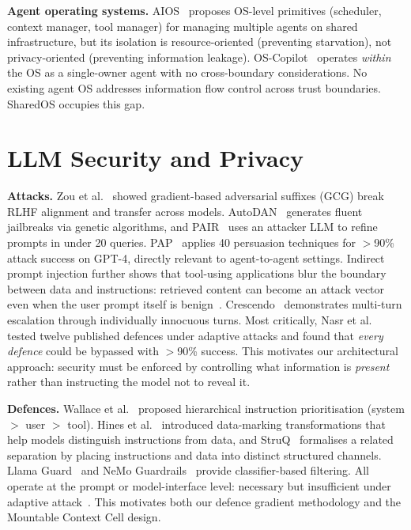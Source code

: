 \textbf{Agent operating systems.} AIOS~\cite{mei2025aios} proposes OS-level primitives (scheduler, context manager, tool manager) for managing multiple agents on shared infrastructure, but its isolation is resource-oriented (preventing starvation), not privacy-oriented (preventing information leakage). OS-Copilot~\cite{wu2024oscopilot} operates \textit{within} the OS as a single-owner agent with no cross-boundary considerations. No existing agent OS addresses information flow control across trust boundaries. SharedOS occupies this gap.


\section{LLM Security and Privacy}
\label{sec:rw_security}

\textbf{Attacks.} Zou et al.~\cite{zou2023universal} showed gradient-based adversarial suffixes (GCG) break RLHF alignment and transfer across models. AutoDAN~\cite{liu2024autodan} generates fluent jailbreaks via genetic algorithms, and PAIR~\cite{chao2025pair} uses an attacker LLM to refine prompts in under 20 queries. PAP~\cite{zeng2024pap} applies 40 persuasion techniques for $>$90\% attack success on GPT-4, directly relevant to agent-to-agent settings. Indirect prompt injection further shows that tool-using applications blur the boundary between data and instructions: retrieved content can become an attack vector even when the user prompt itself is benign~\cite{greshake2023not}. Crescendo~\cite{russinovich2025crescendo} demonstrates multi-turn escalation through individually innocuous turns. Most critically, Nasr et al.~\cite{nasr2025attacker} tested twelve published defences under adaptive attacks and found that \textit{every defence} could be bypassed with $>$90\% success. This motivates our architectural approach: security must be enforced by controlling what information is \textit{present} rather than instructing the model not to reveal it.

\textbf{Defences.} Wallace et al.~\cite{wallace2024instruction} proposed hierarchical instruction prioritisation (system $>$ user $>$ tool). Hines et al.~\cite{hines2024spotlighting} introduced data-marking transformations that help models distinguish instructions from data, and StruQ~\cite{chen2025struq} formalises a related separation by placing instructions and data into distinct structured channels. Llama Guard~\cite{inan2023llamaguard} and NeMo Guardrails~\cite{rebedea2023nemo} provide classifier-based filtering. All operate at the prompt or model-interface level: necessary but insufficient under adaptive attack~\cite{nasr2025attacker}. This motivates both our defence gradient methodology and the Mountable Context Cell design.

